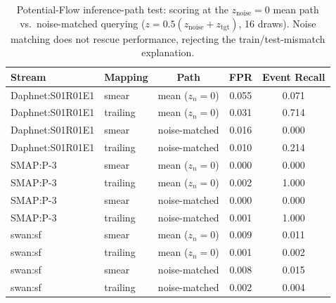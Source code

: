 \begin{table}[t]
\centering
\scriptsize
\caption{Potential-Flow inference-path test: scoring at the $z_{\text{noise}}{=}0$ mean path vs.\ noise-matched querying ($z{=}0.5(z_{\text{noise}}{+}z_{\text{tgt}})$, 16 draws). Noise matching does not rescue performance, rejecting the train/test-mismatch explanation.}\label{tab:pf_noise}
\begin{tabular}{@{}llccc@{}}
\toprule
Stream & Mapping & Path & FPR & Event Recall \\
\midrule
Daphnet:S01R01E1 & smear & mean ($z_n{=}0$) & 0.055 & 0.071 \\
Daphnet:S01R01E1 & trailing & mean ($z_n{=}0$) & 0.031 & 0.714 \\
Daphnet:S01R01E1 & smear & noise-matched & 0.016 & 0.000 \\
Daphnet:S01R01E1 & trailing & noise-matched & 0.010 & 0.214 \\
SMAP:P-3 & smear & mean ($z_n{=}0$) & 0.000 & 0.000 \\
SMAP:P-3 & trailing & mean ($z_n{=}0$) & 0.002 & 1.000 \\
SMAP:P-3 & smear & noise-matched & 0.000 & 0.000 \\
SMAP:P-3 & trailing & noise-matched & 0.001 & 1.000 \\
swan:sf & smear & mean ($z_n{=}0$) & 0.009 & 0.011 \\
swan:sf & trailing & mean ($z_n{=}0$) & 0.001 & 0.002 \\
swan:sf & smear & noise-matched & 0.008 & 0.015 \\
swan:sf & trailing & noise-matched & 0.002 & 0.004 \\
\bottomrule
\end{tabular}
\end{table}

